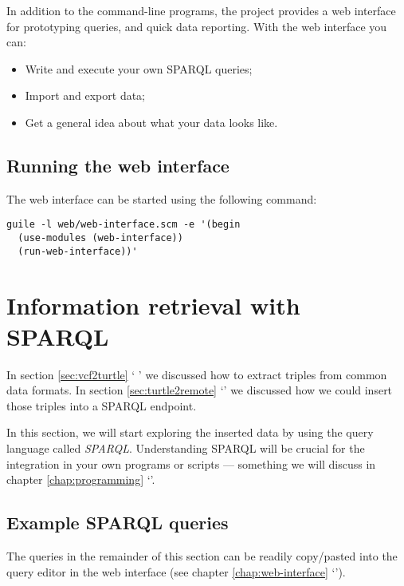 \documentclass[11pt,a4paper,oneside]{book}
\begin{document}
  In addition to the command-line programs, the project provides a web
  interface for prototyping queries, and quick data reporting.  With the
  web interface you can:
  \begin{itemize}
  \item Write and execute your own SPARQL queries;
  \item Import and export data;
  \item Get a general idea about what your data looks like.
  \end{itemize}

\section{Running the web interface}

The web interface can be started using the following command:
\begin{siderules}
\begin{verbatim}
guile -l web/web-interface.scm -e '(begin
  (use-modules (web-interface))
  (run-web-interface))'
\end{verbatim}
\end{siderules}

\chapter{Information retrieval with SPARQL}

  In section \ref{sec:vcf2turtle} {\color{LinkGray}`%
  '} we discussed how to extract
  triples from common data formats.  In section \ref{sec:turtle2remote}
  {\color{LinkGray}`'}
  we discussed how we could insert those triples into a SPARQL endpoint.

  In this section, we will start exploring the inserted data by using the
  query language called \emph{SPARQL}.  Understanding SPARQL will be crucial
  for the integration in your own programs or scripts --- something we will
  discuss in chapter \ref{chap:programming}
  {\color{LinkGray}`'}.

\section{Example SPARQL queries}

  The queries in the remainder of this section can be readily copy/pasted into
  the query editor in the web interface (see chapter \ref{chap:web-interface}
  {\color{LinkGray}`'}).
\end{document}
